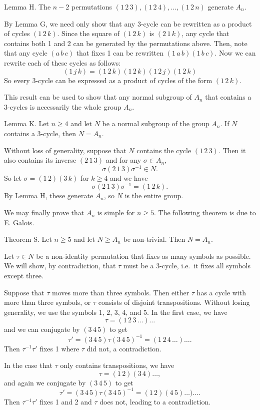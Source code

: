 \proclaim Lemma H. The $n-2$ permutations $(1\,2\,3), (1\,2\,4),\ldots,(1\,2\,n)$ generate $A_n$.

\proof By Lemma G, we need only show that any 3-cycle can be rewritten as a product of cycles $(1\,2\,k)$. Since the square of $(1\,2\,k)$ is $(2\,1\,k)$, any cycle that contains both 1 and 2 can be generated by the permutations above. Then, note that any cycle $(a\,b\,c)$ that fixes 1 can be rewritten $(1\,a\,b)(1\,b\,c)$. Now we can rewrite each of these cycles as follows:
$$(1\,j\,k) = (1\,2\,k)(1\,2\,k)(1\,2\,j)(1\,2\,k)$$
So every 3-cycle can be expressed as a product of cycles of the form $(1\,2\,k)$.\slug

This result can be used to show that any normal subgroup of $A_n$ that contains a 3-cycles is necessarily the whole group $A_n$.

\proclaim Lemma K. Let $n\geq 4$ and let $N$ be a normal subgroup of the group $A_n$. If $N$ contains a 3-cycle, then $N = A_n$.

\proof Without loss of generality, suppose that $N$ contains the cycle $(1\,2\,3)$. Then it also contains its inverse $(2\,1\,3)$ and for any $\sigma\in A_n$,
$$\sigma (2\,1\,3) \sigma^{-1}\in N.$$
So let $\sigma = (1\,2)(3\,k)$ for $k\geq 4$ and we have
$$\sigma (2\,1\,3) \sigma^{-1} = (1\,2\,k).$$
By Lemma H, these generate $A_n$, so $N$ is the entire group.\slug

We may finally prove that $A_n$ is simple for $n\geq 5$. The following theorem is due to E. Galois.

\proclaim Theorem S. Let $n\geq 5$ and let $N\geq A_n$ be non-trivial. Then $N=A_n$.

\proof Let $\tau\in N$ be a non-identity permutation that fixes as many symbols as possible. We will show, by contradiction, that $\tau$ must be a 3-cycle, i.e.\ it fixes all symbols except three.

Suppose that $\tau$ moves more than three symbols. Then either $\tau$ has a cycle with more than three symbols, or $\tau$ consists of disjoint transpositions. Without losing generality, we use the symbols 1, 2, 3, 4, and 5. In the first case, we have
$$\tau = (1\,2\,3\,\ldots)\ldots$$
and we can conjugate by $(3\,4\,5)$ to get
$$\tau' = (3\,4\,5)\tau(3\,4\,5)^{-1} = (1\,2\,4\,\ldots)\ldots.$$
Then $\tau^{-1}\tau'$ fixes 1 where $\tau$ did not, a contradiction.

In the case that $\tau$ only contains transpositions, we have
$$\tau = (1\,2)(3\,4)\ldots,$$
and again we conjugate by $(3\,4\,5)$ to get
$$\tau' = (3\,4\,5)\tau(3\,4\,5)^{-1} = (1\,2)(4\,5)\ldots)\ldots.$$
Then $\tau^{-1}\tau'$ fixes 1 and 2 and $\tau$ does not, leading to a contradiction.

